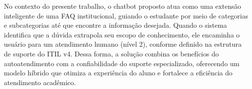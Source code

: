 No contexto do presente trabalho, o chatbot proposto atua como uma extensão inteligente de uma FAQ institucional, guiando o estudante por meio de categorias e subcategorias até que encontre a informação desejada. Quando o sistema identifica que a dúvida extrapola seu escopo de conhecimento, ele encaminha o usuário para um atendimento humano (nível 2), conforme definido na estrutura de suporte do ITIL v4. Dessa forma, a solução combina os benefícios do autoatendimento com a confiabilidade do suporte especializado, oferecendo um modelo híbrido que otimiza a experiência do aluno e fortalece a eficiência do atendimento acadêmico.

